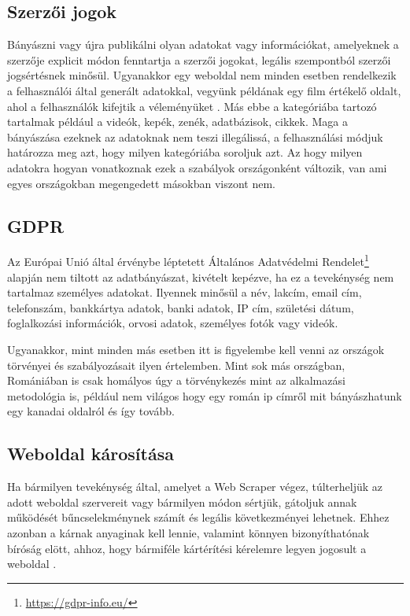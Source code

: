 \subsection{Szerzői jogok}

Bányászni vagy újra publikálni olyan adatokat vagy információkat, amelyeknek a szerzője explicit módon fenntartja a szerzői jogokat, legális szempontból szerzői jogsértésnek minősül. Ugyanakkor egy weboldal nem minden esetben rendelkezik a felhasználói által generált adatokkal, vegyünk példának egy film értékelő oldalt, ahol a felhasználók kifejtik a véleményüket \cite{krotov2018legality}. Más ebbe a kategóriába tartozó tartalmak például a videók, kepék, zenék, adatbázisok, cikkek. Maga a bányászása ezeknek az adatoknak nem teszi illegálissá, a felhasználási módjuk határozza meg azt, hogy milyen kategóriába soroljuk azt. Az hogy milyen adatokra hogyan vonatkoznak ezek a szabályok országonként változik, van ami egyes országokban megengedett másokban viszont nem.

\subsection{GDPR}

Az Európai Unió által érvénybe léptetett Általános Adatvédelmi Rendelet\footnote{\url{https://gdpr-info.eu/}} alapján nem tiltott az adatbányászat, kivételt kepézve, ha ez a tevekénység nem tartalmaz személyes adatokat. Ilyennek minősül a név, lakcím, email cím, telefonszám, bankkártya adatok, banki adatok, IP cím, születési dátum, foglalkozási információk, orvosi adatok, személyes fotók vagy videók.

Ugyanakkor, mint minden más esetben itt is figyelembe kell venni az országok törvényei és szabályozásait ilyen értelemben. Mint sok más országban, Romániában is csak homályos úgy a törvénykezés mint az alkalmazási metodológia is, például nem világos hogy egy román ip címről mit bányászhatunk egy kanadai oldalról és így tovább. 
\subsection{Weboldal károsítása}

Ha bármilyen tevekénység által, amelyet a Web Scraper végez, túlterheljük az adott weboldal szervereit vagy bármilyen módon sértjük, gátoljuk annak működését bűncselekménynek számít és legális következményei lehetnek. Ehhez azonban a kárnak anyaginak kell lennie, valamint könnyen bizonyíthatónak bíróság elött, ahhoz, hogy bármiféle kártérítési kérelemre legyen jogosult a weboldal \cite{krotov2018legality}. 

